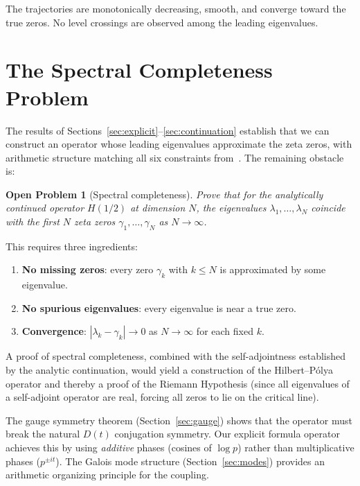 \documentclass[11pt,a4paper]{article}
\newtheorem{problem}{Open Problem}
\begin{document}
The trajectories are monotonically decreasing, smooth, and converge toward the true zeros.
No level crossings are observed among the leading eigenvalues.

\section{The Spectral Completeness Problem}\label{sec:completeness}

The results of Sections~\ref{sec:explicit}--\ref{sec:continuation} establish that we can construct an operator whose leading eigenvalues approximate the zeta zeros, with arithmetic structure matching all six constraints from~\cite{Paper1,Paper2}.
The remaining obstacle is:

\begin{problem}[Spectral completeness]\label{prob:completeness}
Prove that for the analytically continued operator $H(1/2)$ at dimension $N$, the eigenvalues $\lambda_1, \ldots, \lambda_N$ coincide with the first $N$ zeta zeros $\gamma_1, \ldots, \gamma_N$ as $N \to \infty$.
\end{problem}

This requires three ingredients:
\begin{enumerate}[nosep]
\item \textbf{No missing zeros}: every zero $\gamma_k$ with $k \leq N$ is approximated by some eigenvalue.
\item \textbf{No spurious eigenvalues}: every eigenvalue is near a true zero.
\item \textbf{Convergence}: $|\lambda_k - \gamma_k| \to 0$ as $N \to \infty$ for each fixed $k$.
\end{enumerate}

A proof of spectral completeness, combined with the self-adjointness established by the analytic continuation, would yield a construction of the Hilbert--P\'olya operator and thereby a proof of the Riemann Hypothesis (since all eigenvalues of a self-adjoint operator are real, forcing all zeros to lie on the critical line).

The gauge symmetry theorem (Section~\ref{sec:gauge}) shows that the operator must break the natural $D(t)$ conjugation symmetry.
Our explicit formula operator achieves this by using \emph{additive} phases (cosines of $\log p$) rather than multiplicative phases ($p^{\pm it}$).
The Galois mode structure (Section~\ref{sec:modes}) provides an arithmetic organizing principle for the coupling.
\end{document}
